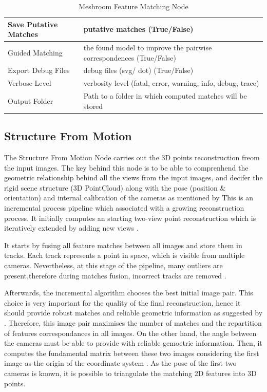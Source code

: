 \documentclass[12pt]{report}
\begin{document}
\begin{table}[h!]
{\begin{tabular}{|l|l|}
  Save Putative Matches &
    putative matches (True/False) \\ \hline
  Guided Matching &
    the found model to improve the pairwise correspondences (True/False) \\ \hline
  Export Debug Files &
    debug files (svg/ dot) (True/False) \\ \hline
  Verbose Level &
    verbosity level (fatal, error, warning, info, debug, trace) \\ \hline
  Output Folder &
    Path to a folder in which computed matches will be stored \\ \hline
  \end{tabular}%
  }
  \caption{Meshroom Feature Matching Node}
  \label{tab:FeatureMatching}
  \end{table}

\subsection{Structure From Motion}

The Structure From Motion Node carries out the 3D points reconstruction freom the input images. The key behind this node is to be able to comprenhend
the geometric relationship behind all the views from the input images, and decifer the rigid scene structure (3D PointCloud) along with the pose (position \& orientation) and internal calibration of the cameras as mentioned by 
This is an incremental process pipeline which associated with a growing reconstruction process. It  initially computes an starting two-view point reconstruction which is iteratively extended by adding new views .

It starts by fusing all feature matches between all images and store them in tracks. Each track represents a point in space, which is visible from multiple cameras. 
Nevertheless, at this stage of the pipeline, many outliers are present,therefore during matches fusion, incorrect tracks are removed \citep*{Fischler1981RandomSC}.

Afterwards, the incremental algorithm chooses the best initial image pair. This choice is very important for the quality of the final reconstruction, hence it should provide robust matches and reliable geometric information as suggested by \citet*{Moulon2012}.
Therefore, this image pair maximises the number of matches and the repartition of features correspondances in all images. On the other hand, the angle between the cameras must be able to provide with reliable gemoetric information.
Then, it computes the fundamental matrix between these two images considering the first image as the origin of the coordinate system . As the pose of the first two cameras is known, 
it is possible to triangulate the matching 2D features into 3D points. 
\end{document}
